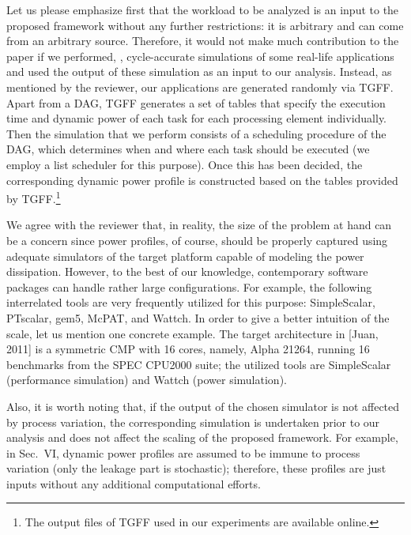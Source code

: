 \begin{authors}
Let us please emphasize first that the workload to be analyzed is an input to the proposed framework without any further restrictions: it is arbitrary and can come from an arbitrary source.
Therefore, it would not make much contribution to the paper if we performed, \eg, cycle-accurate simulations of some real-life applications and used the output of these simulation as an input to our analysis.
Instead, as mentioned by the reviewer, our applications are generated randomly via TGFF.
Apart from a DAG, TGFF generates a set of tables that specify the execution time and dynamic power of each task for each processing element individually.
Then the simulation that we perform consists of a scheduling procedure of the DAG, which determines when and where each task should be executed (we employ a list scheduler for this purpose).
Once this has been decided, the corresponding dynamic power profile is constructed based on the tables provided by TGFF.\footnote{The output files of TGFF used in our experiments are available online.}

We agree with the reviewer that, in reality, the size of the problem at hand can be a concern since power profiles, of course, should be properly captured using adequate simulators of the target platform capable of modeling the power dissipation.
However, to the best of our knowledge, contemporary software packages can handle rather large configurations.
For example, the following interrelated tools are very frequently utilized for this purpose: SimpleScalar, PTscalar, gem5, McPAT, and Wattch.
In order to give a better intuition of the scale, let us mention one concrete example.
The target architecture in [Juan, 2011] is a symmetric CMP with 16 cores, namely, Alpha 21264, running 16 benchmarks from the SPEC CPU2000 suite; the utilized tools are SimpleScalar (performance simulation) and Wattch (power simulation).

Also, it is worth noting that, if the output of the chosen simulator is not affected by process variation, the corresponding simulation is undertaken prior to our analysis and does not affect the scaling of the proposed framework.
For example, in Sec.~VI, dynamic power profiles are assumed to be immune to process variation (only the leakage part is stochastic); therefore, these profiles are just inputs without any additional computational efforts.


\end{authors}

